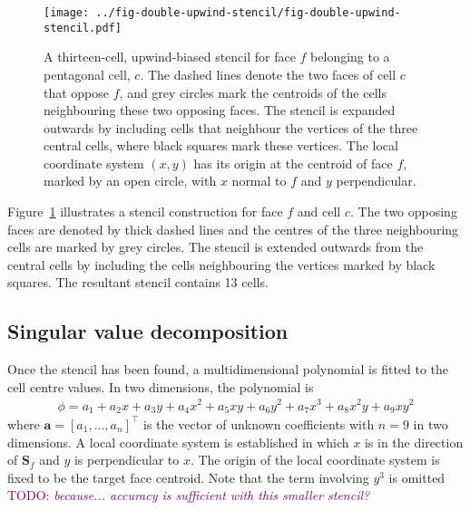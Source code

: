 \documentclass{article}
\newcommand{\TODO}[1]{\textcolor{purple}{TODO: \emph{#1}}}
\begin{document}
\begin{figure}
	\centering
	\texttt{[image: ../fig-double-upwind-stencil/fig-double-upwind-stencil.pdf]}
	\caption{A thirteen-cell, upwind-biased stencil for face $f$ belonging to a pentagonal cell, $c$.  The dashed lines denote the two faces of cell $c$ that oppose $f$, and grey circles mark the centroids of the cells neighbouring these two opposing faces.  The stencil is expanded outwards by including cells that neighbour the vertices of the three central cells, where black squares mark these vertices.  The local coordinate system $(x, y)$ has its origin at the centroid of face $f$, marked by an open circle, with $x$ normal to $f$ and $y$ perpendicular.}
	\label{fig:double-upwind-stencil}
\end{figure}

Figure~\ref{fig:double-upwind-stencil} illustrates a stencil construction for face $f$ and cell $c$.  The two opposing faces are denoted by thick dashed lines and the centres of the three neighbouring cells are marked by grey circles.  The stencil is extended outwards from the central cells by including the cells neighbouring the vertices marked by black squares.  The resultant stencil contains 13 cells.

\subsection{Singular value decomposition}
Once the stencil has been found, a multidimensional polynomial is fitted to the cell centre values.
In two dimensions, the polynomial is
\begin{align}
	\phi = a_1 + a_2 x + a_3 y + a_4 x^2 + a_5 xy + a_6 y^2 + a_7 x^3 + a_8 x^2 y + a_9 x y^2
\end{align}
where $\mathbf{a} = [a_1, \ldots, a_n]^\intercal$ is the vector of unknown coefficients with $n=9$ in two dimensions.  A local coordinate system is established in which $x$ is in the direction of $\mathbf{S}_f$ and $y$ is perpendicular to $x$.
The origin of the local coordinate system is fixed to be the target face centroid.
Note that the term involving $y^3$ is omitted \TODO{because... accuracy is sufficient with this smaller stencil?}
\end{document}
